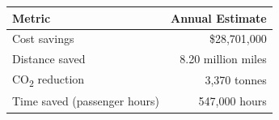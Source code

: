 \begin{tabularx}{\columnwidth}{>{\raggedright\arraybackslash}X r}
\toprule
\textbf{Metric} & \textbf{Annual Estimate} \\
\midrule
Cost savings & \$28,701,000 \\
Distance saved & 8.20 million miles \\
CO\textsubscript{2} reduction & 3,370 tonnes \\
Time saved (passenger hours) & 547,000 hours \\
\bottomrule
\end{tabularx}
